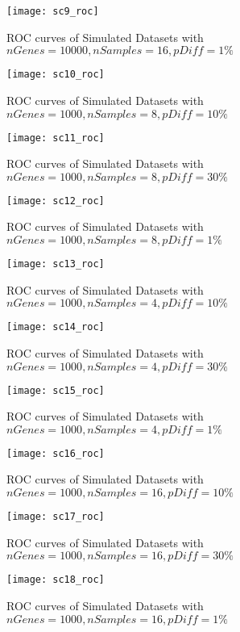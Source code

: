 \begin{figure}[h!tb] 
\texttt{[image: sc9\_roc]}
\caption{ROC curves of Simulated Datasets with $nGenes=10000, nSamples=16, pDiff=1\%$}
\label{sc9_roc}
\end{figure}


\begin{figure}[h!tb] 
\texttt{[image: sc10\_roc]}
\caption{ROC curves of Simulated Datasets with $nGenes=1000, nSamples=8, pDiff=10\%$}
\label{sc10_roc}
\end{figure}




\begin{figure}[h!tb] 
\texttt{[image: sc11\_roc]}
\caption{ROC curves of Simulated Datasets with $nGenes=1000, nSamples=8, pDiff=30\%$}
\label{sc11_roc}
\end{figure}

\begin{figure}[h!tb] 
\texttt{[image: sc12\_roc]}
\caption{ROC curves of Simulated Datasets with $nGenes=1000, nSamples=8, pDiff=1\%$}
\label{sc12_roc}
\end{figure}


\begin{figure}[h!tb] 
\texttt{[image: sc13\_roc]}
\caption{ROC curves of Simulated Datasets with $nGenes=1000, nSamples=4, pDiff=10\%$}
\label{sc13_roc}
\end{figure}


\begin{figure}[h!tb] 
\texttt{[image: sc14\_roc]}
\caption{ROC curves of Simulated Datasets with $nGenes=1000, nSamples=4, pDiff=30\%$}
\label{sc14_roc}
\end{figure}


\begin{figure}[h!tb] 
\texttt{[image: sc15\_roc]}
\caption{ROC curves of Simulated Datasets with $nGenes=1000, nSamples=4, pDiff=1\%$}
\label{sc15_roc}
\end{figure}

\begin{figure}[h!tb] 
\texttt{[image: sc16\_roc]}
\caption{ROC curves of Simulated Datasets with $nGenes=1000, nSamples=16, pDiff=10\%$}
\label{sc16_roc}
\end{figure}

\begin{figure}[h!tb] 
\texttt{[image: sc17\_roc]}
\caption{ROC curves of Simulated Datasets with $nGenes=1000, nSamples=16, pDiff=30\%$}
\label{sc17_roc}
\end{figure}

\begin{figure}[h!tb] 
\texttt{[image: sc18\_roc]}
\caption{ROC curves of Simulated Datasets with $nGenes=1000, nSamples=16, pDiff=1\%$}
\label{sc18_roc}
\end{figure}